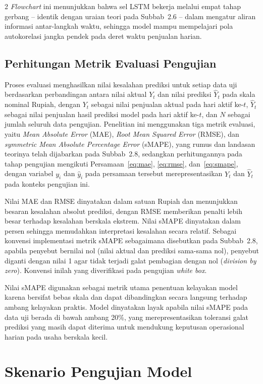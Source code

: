 \documentclass[12pt, a4paper, onecolumn, oneside]{report}
\begin{document}
\begin{spacing}{2}
\textit{Flowchart} ini menunjukkan bahwa sel LSTM bekerja melalui empat tahap gerbang -- identik dengan uraian teori pada Subbab~2.6 -- dalam mengatur aliran informasi antar-langkah waktu, sehingga model mampu mempelajari pola autokorelasi jangka pendek pada deret waktu penjualan harian.
\subsection{Perhitungan Metrik Evaluasi Pengujian}

Proses evaluasi menghasilkan nilai kesalahan prediksi untuk setiap data uji berdasarkan perbandingan antara nilai aktual $Y_t$ dan nilai prediksi $\hat{Y}_t$ pada skala nominal Rupiah, dengan $Y_t$ sebagai nilai penjualan aktual pada hari aktif ke-$t$, $\hat{Y}_t$ sebagai nilai penjualan hasil prediksi model pada hari aktif ke-$t$, dan $N$ sebagai jumlah seluruh data pengujian. Penelitian ini menggunakan tiga metrik evaluasi, yaitu \textit{Mean Absolute Error} (MAE), \textit{Root Mean Squared Error} (RMSE), dan \textit{symmetric Mean Absolute Percentage Error} (sMAPE), yang rumus dan landasan teorinya telah dijabarkan pada Subbab~2.8, sedangkan perhitungannya pada tahap pengujian mengikuti Persamaan~\ref{eq:mae}, \ref{eq:rmse}, dan~\ref{eq:smape}, dengan variabel $y_i$ dan $\hat{y}_i$ pada persamaan tersebut merepresentasikan $Y_t$ dan $\hat{Y}_t$ pada konteks pengujian ini.

Nilai MAE dan RMSE dinyatakan dalam satuan Rupiah dan menunjukkan besaran kesalahan absolut prediksi, dengan RMSE memberikan penalti lebih besar terhadap kesalahan berskala ekstrem. Nilai sMAPE dinyatakan dalam persen sehingga memudahkan interpretasi kesalahan secara relatif. Sebagai konvensi implementasi metrik sMAPE sebagaimana disebutkan pada Subbab~2.8, apabila penyebut bernilai nol (nilai aktual dan prediksi sama-sama nol), penyebut diganti dengan nilai 1 agar tidak terjadi galat pembagian dengan nol (\textit{division by zero}). Konvensi inilah yang diverifikasi pada pengujian \textit{white box}.

Nilai sMAPE digunakan sebagai metrik utama penentuan kelayakan model karena bersifat bebas skala dan dapat dibandingkan secara langsung terhadap ambang kelayakan praktis. Model dinyatakan layak apabila nilai sMAPE pada data uji berada di bawah ambang 20\%, yang merepresentasikan toleransi galat prediksi yang masih dapat diterima untuk mendukung keputusan operasional harian pada usaha berskala kecil.

\section{Skenario Pengujian Model}


\end{spacing}
\end{document}
